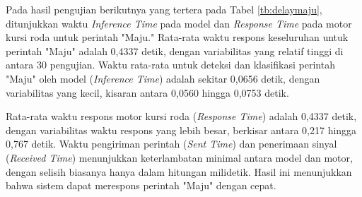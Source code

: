 Pada hasil pengujian berikutnya yang tertera pada Tabel \ref{tb:delaymaju}, ditunjukkan waktu \emph{Inference Time} pada model dan \emph{Response Time} pada motor kursi roda untuk perintah "Maju." Rata-rata waktu respons keseluruhan untuk perintah "Maju" adalah 0,4337 detik, dengan variabilitas yang relatif tinggi di antara 30 pengujian. Waktu rata-rata untuk deteksi dan klasifikasi perintah "Maju" oleh model (\emph{Inference Time}) adalah sekitar 0,0656 detik, dengan variabilitas yang kecil, kisaran antara 0,0560 hingga 0,0753 detik.

Rata-rata waktu respons motor kursi roda (\emph{Response Time}) adalah 0,4337 detik, dengan variabilitas waktu respons yang lebih besar, berkisar antara 0,217 hingga 0,767 detik. Waktu pengiriman perintah (\emph{Sent Time}) dan penerimaan sinyal (\emph{Received Time}) menunjukkan keterlambatan minimal antara model dan motor, dengan selisih biasanya hanya dalam hitungan milidetik. Hasil ini menunjukkan bahwa sistem dapat merespons perintah "Maju" dengan cepat.


